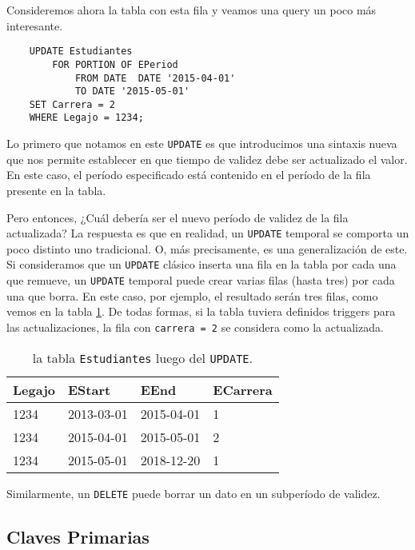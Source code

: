 Consideremos ahora la tabla con esta fila y veamos una query un poco más interesante.

\begin{verbatim}
    UPDATE Estudiantes
        FOR PORTION OF EPeriod
            FROM DATE  DATE '2015-04-01'
            TO DATE '2015-05-01'
    SET Carrera = 2
    WHERE Legajo = 1234;
\end{verbatim}

Lo primero que notamos en este \texttt{UPDATE} es que introducimos una sintaxis nueva que nos permite establecer
en que tiempo de validez debe ser actualizado el valor.
En este caso, el período especificado está contenido en el período de la fila presente en la tabla.

Pero entonces, ¿Cuál debería ser el nuevo período de validez de la fila actualizada?
La respuesta es que en realidad, un \texttt{UPDATE} temporal se comporta un poco distinto uno tradicional.
O, más precisamente, es una generalización de este.
Si consideramos que un \texttt{UPDATE} clásico inserta una fila en la tabla por cada una que remueve,
un \texttt{UPDATE} temporal puede crear varias filas (hasta tres) por cada una que borra.
En este caso, por ejemplo, el resultado serán tres filas, como vemos en la tabla \ref{tab:update}.
De todas formas, si la tabla tuviera definidos triggers para las actualizaciones,
la fila con \texttt{carrera = 2} se considera como la actualizada.

\begin{table}[]
    \center \begin{tabular}{l|l|l|l}
    Legajo & EStart     & EEnd       & ECarrera \\ \hline
    1234   & 2013-03-01 & 2015-04-01 & 1        \\
    1234   & 2015-04-01 & 2015-05-01 & 2        \\
    1234   & 2015-05-01 & 2018-12-20 & 1
    \end{tabular}
    \caption{la tabla \texttt{Estudiantes} luego del \texttt{UPDATE}.}
    \label{tab:update}
\end{table}

Similarmente, un \texttt{DELETE} puede borrar un dato en un subperíodo de validez.

\subsection{Claves Primarias}

